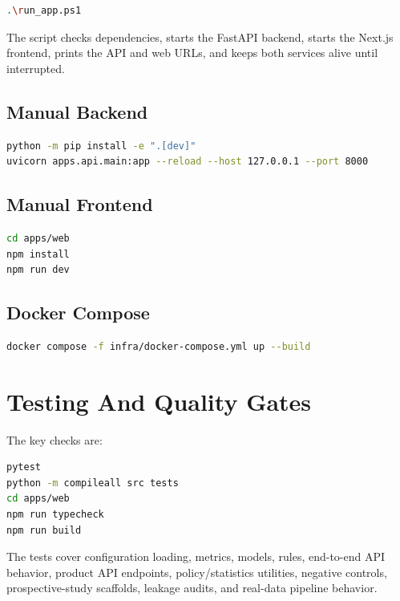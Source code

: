 \documentclass[11pt]{article}
\begin{document}
\begin{lstlisting}[language=bash]
.\run_app.ps1
\end{lstlisting}

The script checks dependencies, starts the FastAPI backend, starts the Next.js frontend, prints the API and web URLs, and keeps both services alive until interrupted.

\subsection{Manual Backend}

\begin{lstlisting}[language=bash]
python -m pip install -e ".[dev]"
uvicorn apps.api.main:app --reload --host 127.0.0.1 --port 8000
\end{lstlisting}

\subsection{Manual Frontend}

\begin{lstlisting}[language=bash]
cd apps/web
npm install
npm run dev
\end{lstlisting}

\subsection{Docker Compose}

\begin{lstlisting}[language=bash]
docker compose -f infra/docker-compose.yml up --build
\end{lstlisting}

\section{Testing And Quality Gates}

The key checks are:

\begin{lstlisting}[language=bash]
pytest
python -m compileall src tests
cd apps/web
npm run typecheck
npm run build
\end{lstlisting}

The tests cover configuration loading, metrics, models, rules, end-to-end API behavior, product API endpoints, policy/statistics utilities, negative controls, prospective-study scaffolds, leakage audits, and real-data pipeline behavior.
\end{document}
